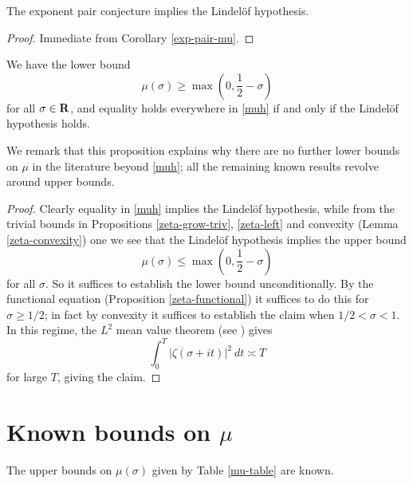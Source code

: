 
\begin{lemma}\label{exp-pair_implies_lindelof}  The exponent pair conjecture implies the Lindel\"of hypothesis.
\end{lemma}

\begin{proof} Immediate from Corollary \ref{exp-pair-mu}.
\end{proof}

\begin{proposition}\label{mu-conj}  We have the lower bound
\begin{equation}\label{muh}
    \mu(\sigma) \geq \max\left(0, \frac{1}{2}-\sigma\right)
\end{equation}
for all $\sigma \in \mathbf{R}$, and equality holds everywhere in \eqref{muh} if and only if the Lindel\"of hypothesis holds.
\end{proposition}

We remark that this proposition explains why there are no further lower bounds on $\mu$ in the literature beyond \eqref{muh}; all the remaining known results revolve around upper bounds.

\begin{proof}  Clearly equality in \eqref{muh} implies the Lindel\"of hypothesis, while from the trivial bounds in Propositions \ref{zeta-grow-triv}, \ref{zeta-left} and convexity (Lemma \ref{zeta-convexity}) one we see that the Lindel\"of hypothesis implies the upper bound
$$     \mu(\sigma) \leq \max\left(0, \frac{1}{2}-\sigma\right)$$
for all $\sigma$.  So it suffices to establish the lower bound unconditionally.  By the functional equation (Proposition \ref{zeta-functional}) it suffices to do this for $\sigma \geq 1/2$; in fact by convexity it suffices to establish the claim when $1/2 < \sigma < 1$.  In this regime, the $L^2$ mean value theorem (see \cite[Theorem 1.11]{ivic}) gives
$$ \int_0^T |\zeta(\sigma+it)|^2\ dt \asymp T$$
for large $T$, giving the claim.
\end{proof}

\section{Known bounds on \texorpdfstring{$\mu$}{mu}}

\begin{theorem}\label{mu-hist}  The upper bounds on $\mu(\sigma)$ given by Table \ref{mu-table} are known.
\end{theorem}

